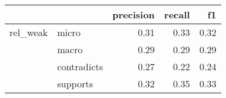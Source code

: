 \begin{tabular}{llrrr}
\toprule
         &          &  precision &  recall &   f1 \\
\midrule
rel\_weak & micro &       0.31 &    0.33 & 0.32 \\
         & macro &       0.29 &    0.29 & 0.29 \\
         & contradicts &       0.27 &    0.22 & 0.24 \\
         & supports &       0.32 &    0.35 & 0.33 \\
\bottomrule
\end{tabular}
